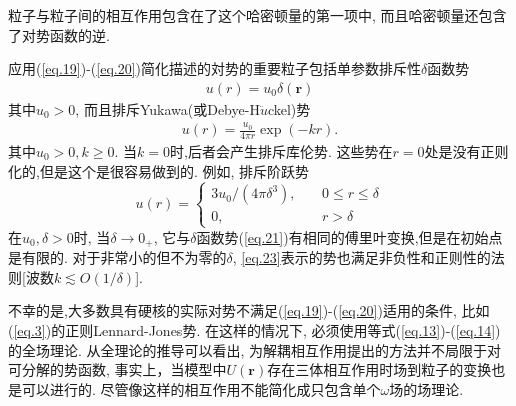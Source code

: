 粒子与粒子间的相互作用包含在了这个哈密顿量的第一项中, 而且哈密顿量还包含了对势函数的逆.
\par
应用(\ref{eq.19})-(\ref{eq.20})简化描述的対势的重要粒子包括单参数排斥性$\delta$函数势
\label{subsec.equations}
   \begin{equation}
       \begin{aligned}
           u(r)=u_0\delta(\bm{r})
       \end{aligned}
       \label{eq.21}
    \end{equation}
其中$u_0 >0 $, 而且排斥Yukawa(或Debye-H$\ddot{u}$ckel)势
\label{subsec.equations}
   \begin{equation}
       \begin{aligned}
           u(r)=\frac{u_0}{4\pi r}\exp(-kr).
       \end{aligned}
       \label{eq.22}
    \end{equation}
其中$u_0>0, k\geq 0$. 当$k=0$时,后者会产生排斥库伦势.
这些势在$r=0$处是没有正则化的,但是这个是很容易做到的. 例如, 排斥阶跃势
\label{subsec.equations}
   \begin{equation}
       u(r)=\left\{
       \begin{aligned}
           3u_0/(4\pi\delta^3),& &\ 0\leq r\leq\delta
               \\
           0,& &\ r>\delta
       \end{aligned}
       \right.
       \label{eq.23}      
    \end{equation}
在$u_0, \delta>0$时, 当$\delta\longrightarrow 0_{+}$,
它与$\delta$函数势(\ref{eq.21})有相同的傅里叶变换,但是在初始点是有限的.
对于非常小的但不为零的$\delta$,
\ref{eq.23}表示的势也满足非负性和正则性的法则[波数$k\lesssim O(1/\delta)$].
\par
不幸的是,大多数具有硬核的实际对势不满足(\ref{eq.19})-(\ref{eq.20})适用的条件,
比如(\ref{eq.3})的正则Lennard-Jones势. 在这样的情况下,
必须使用等式(\ref{eq.13})-(\ref{eq.14})的全场理论. 从全理论的推导可以看出,
为解耦相互作用提出的方法并不局限于对可分解的势函数,
事实上，当模型中$U(\bm{r})$存在三体相互作用时场到粒子的变换也是可以进行的.
尽管像这样的相互作用不能简化成只包含单个$\omega$场的场理论.

